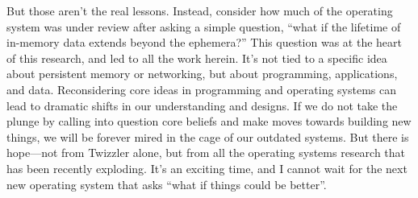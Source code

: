 But those aren't the real lessons. Instead, consider how much of the operating system was under review after asking a
simple question, ``what if the lifetime of in-memory data extends beyond the ephemera?'' This question was at the heart
of this research, and led to all the work herein. It's not tied to a specific idea about persistent
memory or networking, but about programming, applications, and
data. Reconsidering core ideas in programming and operating systems can lead to dramatic shifts in our understanding and
designs. If we do not take the plunge by calling into question core beliefs and make moves towards building new things,
we will be forever mired in the cage of our outdated systems. But there is hope---not from Twizzler alone, but from all
the operating systems research that has been recently exploding. It's an exciting time, and I cannot wait for the next
new operating system that asks ``what if things could be better''.


